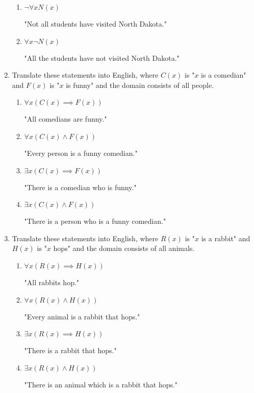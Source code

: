\documentclass[11pt]{article}
\begin{document}
\begin{enumerate}[label=\textbf{\arabic*.}]
\begin{enumerate}[label=\textbf{\alph*)}]
		\item $\neg \forall xN(x)$
		
		"Not all students have visited North Dakota."
		
		\item $\forall x\neg N(x)$
		
		"All the students have not visited North Dakota."
	\end{enumerate}

	\item Translate these statements into English, where $C(x)$ is "$x$ is a comedian" and $F(x)$ is "$x$ is funny" and the domain consists of all people.
	\begin{enumerate}[label=\textbf{\alph*)}]
		\item $\forall x(C(x) \implies F(x))$
		
		"All comedians are funny."
		
		\item $\forall x(C(x) \land F(x))$
		
		"Every person is a funny comedian."
		
		\item $\exists x(C(x) \implies F(x))$
		
		"There is a comedian who is funny."
		
		\item $\exists x(C(x) \land F(x))$
		
		"There is a person who is a funny comedian."
	\end{enumerate}

	\item Translate these statements into English, where $R(x)$ is "$x$ is a rabbit" and $H(x)$ is "$x$ hops" and the domain consists of all animals.
	\begin{enumerate}[label=\textbf{\alph*)}]
		\item $\forall x(R(x) \implies H(x))$
		
		"All rabbits hop."
		
		\item $\forall x(R(x) \land H(x))$
		
		"Every animal is a rabbit that hops."
		
		\item $\exists x(R(x) \implies H(x))$
		
		"There is a rabbit that hops."
		
		\item $\exists x(R(x) \land H(x))$
		
		"There is an animal which is a rabbit that hops."
	\end{enumerate}


\end{enumerate}
\end{document}
